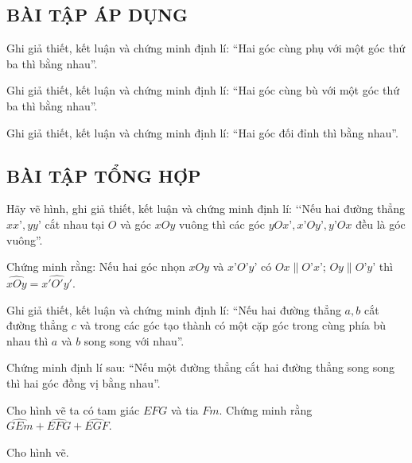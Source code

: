 \subsection{BÀI TẬP ÁP DỤNG}
\begin{bt}
Ghi giả thiết, kết luận và chứng minh định lí: “Hai góc cùng phụ với một góc thứ ba thì bằng nhau”.
\end{bt}   \begin{bt}
Ghi giả thiết, kết luận và chứng minh định lí: “Hai góc cùng bù với một góc thứ ba thì bằng nhau”.
\end{bt}   \begin{bt}
Ghi giả thiết, kết luận và chứng minh định lí: “Hai góc đối đỉnh thì bằng nhau”.
\subsection{BÀI TẬP TỔNG HỢP}
\end{bt}   \begin{bt}
Hãy vẽ hình, ghi giả thiết, kết luận và chứng minh định lí: ‘‘Nếu hai đường thẳng $xx’, yy’$ cắt nhau tại $O$ và góc $xOy$ vuông thì các góc $yOx’, x’Oy’, y’Ox$ đều là góc vuông”.
\end{bt}   \begin{bt}
Chứng minh rằng: Nếu hai góc nhọn $xOy$ và $x’O’y’$ có $Ox \parallel O’x’$; $Oy \parallel O’y’$ thì $\widehat{xOy}=\widehat{x'O'y'}$.
\end{bt}   \begin{bt}
Ghi giả thiết, kết luận và chứng minh định lí: “Nếu hai đường thẳng $a, b$ cắt đường thẳng $c$ và trong các góc tạo thành có một cặp góc trong cùng phía bù nhau thì $a$ và $b$ song song với nhau”.
\end{bt}   \begin{bt}
Chứng minh định lí sau: “Nếu một đường thẳng cắt hai đường thẳng song song thì hai góc đồng vị bằng nhau”.
\end{bt}   \begin{bt}
Cho hình vẽ ta có tam giác $EFG$ và tia $Fm$. Chứng minh rằng $\widehat{GEm}+\widehat{EFG}+\widehat{EGF}$.
\end{bt}   \begin{bt}
Cho hình vẽ.
\begin{enumerate}[a)]

\end{enumerate}
\end{bt}
